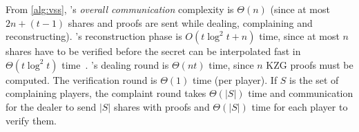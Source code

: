 From \cref{alg:vss}, \evss's \textit{overall communication} complexity is $\Theta(n)$ (since at most $2n+(t-1)$ shares and proofs are sent while dealing, complaining and reconstructing).
\evss's reconstruction phase is $O(t\log^2{t} + n)$ time, since at most $n$ shares have to be verified before the secret can be interpolated fast in $\Theta(t\log^2{t})$ time~\cite{moderncomputeralgebra-ch10}.
\evss's dealing round is $\Theta(nt)$ time, since $n$ KZG proofs must be computed.
The verification round is $\Theta(1)$ time (per player).
If $S$ is the set of complaining players, the complaint round takes $\Theta(|S|)$ time and communication for the dealer to send $|S|$ shares with proofs and $\Theta(|S|)$ time for each player to verify them.


